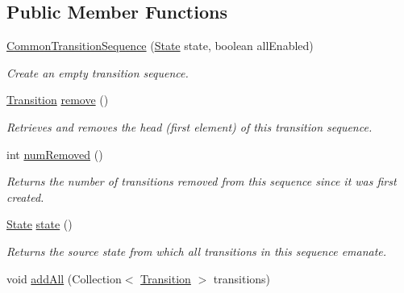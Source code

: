\subsection*{Public Member Functions}
\begin{DoxyCompactItemize}
\item 
\hyperlink{classedu_1_1udel_1_1cis_1_1vsl_1_1civl_1_1semantics_1_1common_1_1CommonTransitionSequence_a82116e33b2a0d386e1c94781da3a067c}{Common\+Transition\+Sequence} (\hyperlink{interfaceedu_1_1udel_1_1cis_1_1vsl_1_1civl_1_1state_1_1IF_1_1State}{State} state, boolean all\+Enabled)
\begin{DoxyCompactList}\small\item\em Create an empty transition sequence. \end{DoxyCompactList}\item 
\hyperlink{interfaceedu_1_1udel_1_1cis_1_1vsl_1_1civl_1_1semantics_1_1IF_1_1Transition}{Transition} \hyperlink{classedu_1_1udel_1_1cis_1_1vsl_1_1civl_1_1semantics_1_1common_1_1CommonTransitionSequence_a22766dae16c0152296195124c62355a4}{remove} ()
\begin{DoxyCompactList}\small\item\em Retrieves and removes the head (first element) of this transition sequence. \end{DoxyCompactList}\item 
int \hyperlink{classedu_1_1udel_1_1cis_1_1vsl_1_1civl_1_1semantics_1_1common_1_1CommonTransitionSequence_acd4d9eae85a09449ee0b176fa4c9dfb8}{num\+Removed} ()
\begin{DoxyCompactList}\small\item\em Returns the number of transitions removed from this sequence since it was first created. \end{DoxyCompactList}\item 
\hyperlink{interfaceedu_1_1udel_1_1cis_1_1vsl_1_1civl_1_1state_1_1IF_1_1State}{State} \hyperlink{classedu_1_1udel_1_1cis_1_1vsl_1_1civl_1_1semantics_1_1common_1_1CommonTransitionSequence_aa9f72f08f445a998abbe752985b616e5}{state} ()
\begin{DoxyCompactList}\small\item\em Returns the source state from which all transitions in this sequence emanate. \end{DoxyCompactList}\item 
void \hyperlink{classedu_1_1udel_1_1cis_1_1vsl_1_1civl_1_1semantics_1_1common_1_1CommonTransitionSequence_ab79a5cc7068f588073d0826314890f9b}{add\+All} (Collection$<$ \hyperlink{interfaceedu_1_1udel_1_1cis_1_1vsl_1_1civl_1_1semantics_1_1IF_1_1Transition}{Transition} $>$ transitions)

\end{DoxyCompactItemize}
